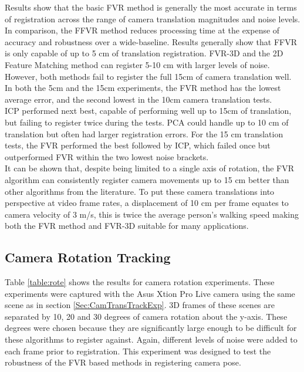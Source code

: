Results show that the basic FVR method is generally the most accurate in terms of registration across the range of camera translation magnitudes and noise levels. In comparison, the FFVR method reduces processing time at the expense of accuracy and robustness over a wide-baseline. Results generally show that FFVR is only capable of up to 5 cm of translation registration. FVR-3D and the 2D Feature Matching method can register 5-10 cm with larger levels of noise. However, both methods fail to register the full 15cm of camera translation well. In both the 5cm and the 15cm experiments, the FVR method has the lowest average error, and the second lowest in the 10cm camera translation tests. \\

ICP performed next best, capable of performing well up to 15cm of translation, but failing to register twice during the tests. PCA could handle up to 10 cm of translation but often had larger registration errors. For the 15 cm translation tests, the FVR performed the best followed by ICP, which failed once but outperformed FVR within the two lowest noise brackets. \\


It can be shown that, despite being limited to a single axis of rotation, the FVR algorithm can consistently register camera movements up to 15 cm better than other algorithms from the literature. To put these camera translations into perspective at video frame rates, a displacement of 10 cm per frame equates to camera velocity of 3 m/s, this is twice the average person's walking speed making both the FVR method and FVR-3D suitable for many applications. \\


\subsection{Camera Rotation Tracking}
\label{Sec:CamRoteTrackExp}

Table \ref{table:rote} shows the results for camera rotation experiments. These experiments were captured with the Asus Xtion Pro Live camera using the same scene as in section \ref{Sec:CamTransTrackExp}. 3D frames of these scenes are separated by 10, 20 and 30 degrees of camera rotation about the y-axis. These degrees were chosen because they are significantly large enough to be difficult for these algorithms to register against. Again, different levels of noise were added to each frame prior to registration. This experiment was designed to test the robustness of the FVR based methods in registering camera pose. \\



